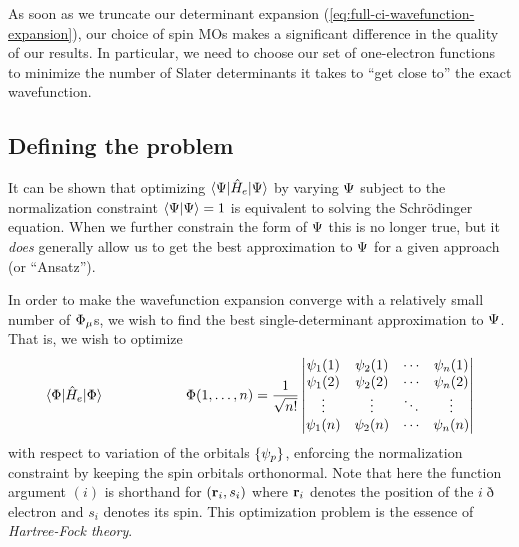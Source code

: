 \documentclass[11pt]{article}
\numberwithin{equation}{section}
\begin{document}
As soon as we truncate our determinant expansion (\ref{eq:full-ci-wavefunction-expansion}), our choice of spin MOs makes a significant difference in the quality of our results.
In particular, we need to choose our set of one-electron functions to minimize the number of Slater determinants it takes to ``get close to'' the exact wavefunction.


\subsection{Defining the problem}

It can be shown that optimizing $\langle\Psi |\hat{H}_e|\Psi \rangle$ by varying $\Psi $ subject to the normalization constraint $\langle\Psi |\Psi \rangle=1$ is equivalent to solving the Schr\"odinger equation.
When we further constrain the form of $\Psi $ this is no longer true, but it \textit{does} generally allow us to get the best approximation to $\Psi $ for a given approach (or ``Ansatz'').

In order to make the wavefunction expansion converge with a relatively small number of $\F_\mu$s, we wish to find the best single-determinant approximation to $\Psi $.
That is, we wish to optimize
\begin{align}
	\ip{\F|\op{H}_e|\F}
\sp\sp
	\F(1,\ld,n)
=
\fr{1}{\sqrt{n!}}
\left|\ar{
	\y_1(1)&\y_2(1)&\cd&\y_n(1)\\
	\y_1(2)&\y_2(2)&\cd&\y_n(2)\\
	\vd    &\vd    &\dd&\vd    \\
	\y_1(n)&\y_2(n)&\cd&\y_n(n)}\right|
\end{align}
with respect to variation of the orbitals $\{\psi _p\}$, enforcing the normalization constraint by keeping the spin orbitals orthonormal.
Note that here the function argument $(i)$ is shorthand for $(\mathbf{r}_i,s_i)$ where $\mathbf{r}_i$ denotes the position of the $i\eth$ electron and $s_i$ denotes its spin.
This optimization problem is the essence of \textit{Hartree-Fock theory}.
\end{document}
